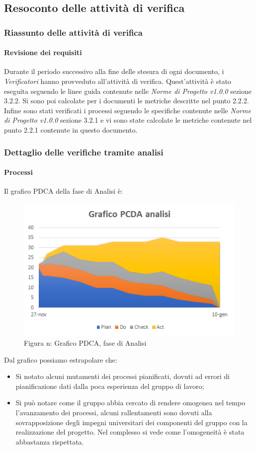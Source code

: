 \subsection{Resoconto delle attività di verifica}
\subsubsection{Riassunto delle attività di verifica}
\paragraph{Revisione dei requisiti} \Spazio
Durante il periodo successivo alla fine delle stesura di ogni documento, i \emph{Verificatori}  hanno provveduto all'attività di verifica. Quest'attività è stato eseguita seguendo le linee guida contenute nelle \emph{Norme di Progetto v1.0.0} sezione 3.2.2.
Si sono poi calcolate per i documenti le metriche descritte nel punto 2.2.2.
Infine sono stati verificati i processi seguendo le specifiche contenute nelle \emph{Norme di Progetto v1.0.0} sezione 3.2.1 e vi sono state calcolate le metriche contenute nel punto 2.2.1 contenute in questo documento.
\subsubsection{Dettaglio delle verifiche tramite analisi}
\paragraph{Processi}
Il grafico PDCA della fase di Analisi è:
\begin{figure} [H]
	\centering
	\includegraphics[scale=1]{Img/Grafico_PDCA}
	\caption{Figura n: Grafico PDCA, fase di Analisi}\label{}
\end{figure}
Dal grafico possiamo estrapolare che:
\begin{itemize}
	\item Si notato alcuni mutamenti dei processi pianificati, dovuti ad errori di pianificazione dati dalla poca esperienza del gruppo di lavoro;
	\item Si può notare come il gruppo abbia cercato di rendere omogenea nel tempo l'avanzamento dei processi, alcuni rallentamenti sono dovuti alla sovrapposizione degli impegni
	universitari dei componenti del gruppo con la realizzazione del progetto. Nel complesso si vede come l'omogeneità è stata abbastanza rispettata.
\end{itemize}
